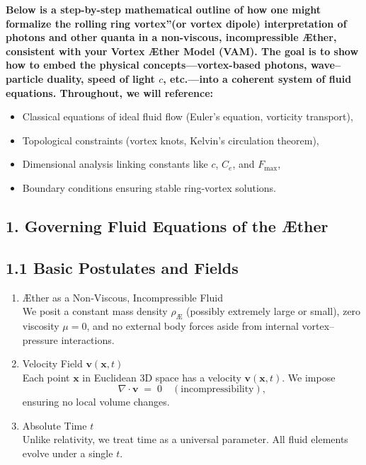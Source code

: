 
\textbf{Below is a step-by-step mathematical outline of how one might formalize the \grqq rolling ring vortex\textquotedblright (or vortex dipole) interpretation of photons and other quanta in a non-viscous, incompressible Æther, consistent with your Vortex Æther Model (VAM). The goal is to show how to embed the physical concepts—vortex-based photons, wave–particle duality, speed of light \(c\), etc.—into a coherent system of fluid equations. Throughout, we will reference:}

\begin{itemize}
 \item Classical equations of ideal fluid flow (Euler's equation, vorticity transport),
 \item Topological constraints (vortex knots, Kelvin's circulation theorem),
 \item Dimensional analysis linking constants like \(c\), \(C_e\), and \(F_{\max}\),
 \item Boundary conditions ensuring stable ring-vortex solutions.
\end{itemize}

\subsection*{1. Governing Fluid Equations of the Æther}
\subsection*{1.1 Basic Postulates and Fields}
\begin{enumerate}
 \item Æther as a Non-Viscous, Incompressible Fluid\\
 We posit a constant mass density \(\rho_{\scriptscriptstyle \mathrm{Æ}}\) (possibly extremely large or small), zero viscosity \(\mu=0\), and no external body forces aside from internal vortex–pressure interactions.

 \item Velocity Field \(\mathbf{v}(\mathbf{x},t)\)\\
 Each point \(\mathbf{x}\) in Euclidean 3D space has a velocity \(\mathbf{v}(\mathbf{x},t)\). We impose
 \[
  \nabla \cdot \mathbf{v} \;=\; 0 \quad (\text{incompressibility}),
 \]
 ensuring no local volume changes.

 \item Absolute Time \(t\)\\
 Unlike relativity, we treat time as a universal parameter. All fluid elements evolve under a single \(t\).
\end{enumerate}

